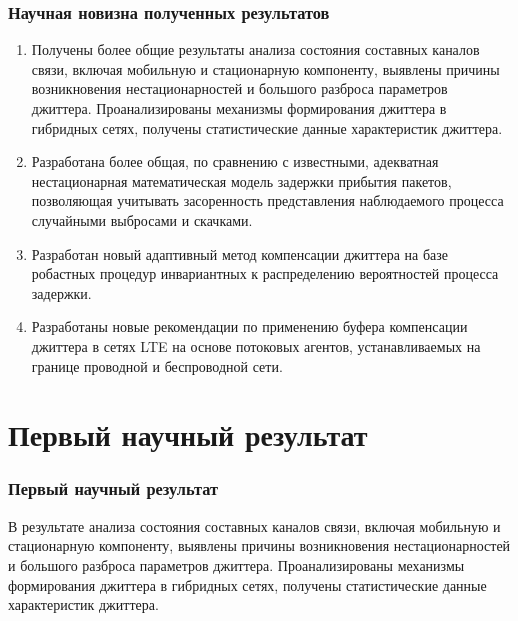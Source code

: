 \documentclass[10pt,pdf,hyperref={unicode}]{beamer}
\begin{document}
\begin{frame}
\frametitle{Научная новизна полученных результатов}
{\small
\begin{enumerate}
  \item Получены более общие результаты анализа состояния составных каналов связи, включая мобильную и стационарную компоненту, выявлены причины возникновения нестационарностей и большого разброса параметров джиттера.
  Проанализированы механизмы формирования джиттера в гибридных сетях, получены статистические данные характеристик джиттера.
  \item Разработана более общая, по сравнению с известными, адекватная нестационарная математическая модель задержки прибытия пакетов,
  позволяющая учитывать засоренность представления наблюдаемого процесса случайными выбросами и скачками.
  \item 
  Разработан новый адаптивный метод компенсации джиттера на базе робастных процедур инвариантных к распределению вероятностей процесса задержки.
  \item 
  Разработаны новые рекомендации по применению буфера компенсации джиттера в сетях LTE на основе потоковых агентов, устанавливаемых на границе проводной и беспроводной сети.
\end{enumerate}
}
\end{frame}





\section{Первый научный результат}

\begin{frame}
\frametitle{Первый научный результат}

{\Large В результате анализа состояния составных каналов связи, включая мобильную и стационарную компоненту, выявлены причины возникновения нестационарностей и большого разброса параметров джиттера.
  Проанализированы механизмы формирования джиттера в гибридных сетях, получены статистические данные характеристик джиттера.}

\end{frame}
\end{document}
